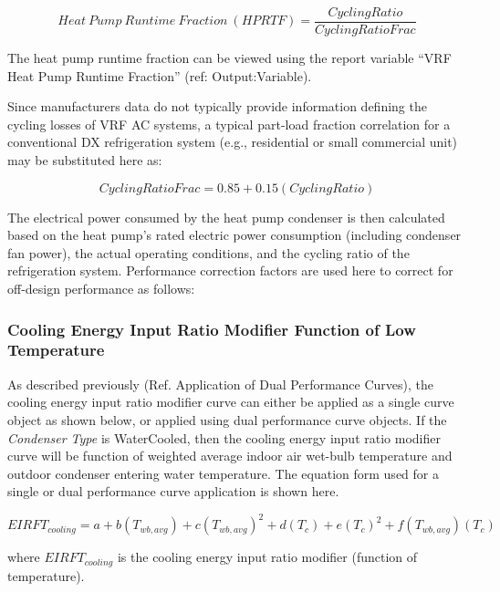 \begin{equation}
  Heat~Pump~Runtime~Fraction~(HPRTF) = \frac{CyclingRatio}{CyclingRatioFrac}
\end{equation}

The heat pump runtime fraction can be viewed using the report variable ``VRF Heat Pump Runtime Fraction'' (ref: Output:Variable).

Since manufacturers data do not typically provide information defining the cycling losses of VRF AC systems, a typical part-load fraction correlation for a conventional DX refrigeration system (e.g., residential or small commercial unit) may be substituted here as:

\begin{equation}
  CyclingRatioFrac = 0.85 + 0.15(CyclingRatio)
\end{equation}

The electrical power consumed by the heat pump condenser is then calculated based on the heat pump's rated electric power consumption (including condenser fan power), the actual operating conditions, and the cycling ratio of the refrigeration system. Performance correction factors are used here to correct for off-design performance as follows:

\subsubsection{Cooling Energy Input Ratio Modifier Function of Low Temperature}\label{cooling-energy-input-ratio-modifier-function-of-low-temperature}

As described previously (Ref. Application of Dual Performance Curves), the cooling energy input ratio modifier curve can either be applied as a single curve object as shown below, or applied using dual performance curve objects. If the \textit{Condenser Type} is WaterCooled, then the cooling energy input ratio modifier curve will be function of weighted average indoor air wet-bulb temperature and outdoor condenser entering water temperature. The equation form used for a single or dual performance curve application is shown here.

\begin{equation}
  EIRFT_{cooling} = a + b \left( T_{wb,avg} \right) + c \left( T_{wb,avg} \right)^2 + d \left( T_c \right) + e \left( T_c \right)^2 + f \left( T_{wb,avg} \right) \left( T_c \right)
\end{equation}

where \(EIRFT_{cooling}\) is the cooling energy input ratio modifier (function of temperature).


